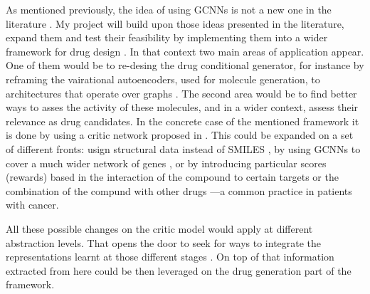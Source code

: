 \documentclass{article}
\begin{document}
As mentioned previously, the idea of using GCNNs is not a new one in the literature
\cite{Sun2019}. My project will build upon those ideas presented in the literature,
expand them and test their feasibility by implementing them into a wider framework for
drug design \cite{Born2019}. In that context two main areas of application appear. One
of them would be to re-desing the drug conditional generator, for instance by reframing
the vairational autoencoders, used for molecule generation, to architectures that
operate over graphs \cite{Simonovsky2018,Li2018,Li2018a}. The second area would be to
find better ways to asses the activity of these molecules, and in a wider context,
assess their relevance as drug candidates. In the concrete case of the mentioned
framework it is done by using a critic network proposed in \cite{Manica2019}. This could
be expanded on a set of different fronts: usign structural data instead of SMILES
\cite{Li,Do2019}, by using GCNNs to cover a much wider network of genes
\cite{Oskooei2019, Wang2019}, or by introducing particular scores (rewards) based in the
interaction of the compound to certain targets \cite{YingkaiGao2018, Zhavoronkov2019} or
the combination of the compund with other drugs \cite{Zitnik2018} ---a common practice
in patients with cancer.

All these possible changes on the critic model would apply at different abstraction
levels. That opens the door to seek for ways to integrate the representations learnt at
those different stages \cite{Ying2018, Ma2019, Huang2019}. On top of that information
extracted from here could be then leveraged on the drug generation part of the
framework.


\end{document}
